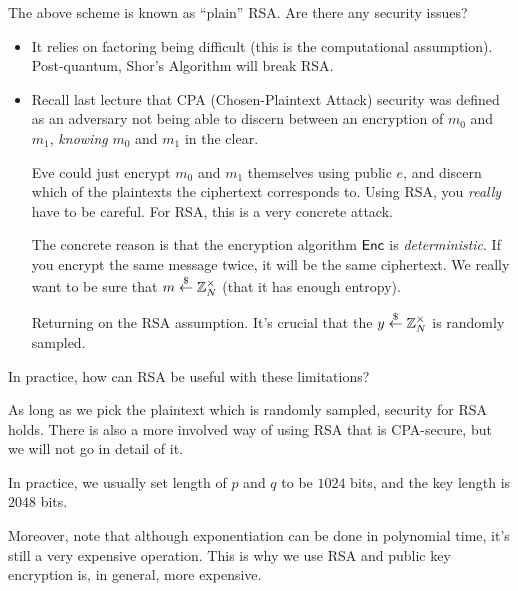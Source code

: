 \begin{ques*}
    The above scheme is known as ``plain'' RSA. Are there any security issues?
\end{ques*}
\begin{itemize}
    \item It relies on factoring being difficult (this is the computational assumption). Post-quantum, Shor's Algorithm will break RSA.
    \item Recall last lecture that CPA (Chosen-Plaintext Attack) security was defined as an adversary not being able to discern between an encryption of $m_0$ and $m_1$, \emph{knowing} $m_0$ and $m_1$ in the clear.

          Eve could just encrypt $m_0$ and $m_1$ themselves using public $e$, and discern which of the plaintexts the ciphertext corresponds to. Using RSA, you \emph{really} have to be careful. For RSA, this is a very concrete attack.

          The concrete reason is that the encryption algorithm $\operatorname{\mathsf{Enc}}$ is \emph{deterministic}. If you encrypt the same message twice, it will be the same ciphertext. We really want to be sure that $m\overset{\$}{\leftarrow} \mathbb Z_N^\times$ (that it has enough entropy).

          Returning on the RSA assumption. It's crucial that the $y\overset{\$}{\leftarrow} \mathbb Z_N^\times$ is randomly sampled.
\end{itemize}

\begin{ques*}
    In practice, how can RSA be useful with these limitations?
\end{ques*}

As long as we pick the plaintext which is randomly sampled, security for RSA holds. There is also a more involved way of using RSA that is CPA-secure, but we will not go in detail of it.

\begin{remark*}
    In practice, we usually set length of $p$ and $q$ to be $1024$ bits, and the key length is $2048$ bits.

    Moreover, note that although exponentiation can be done in polynomial time, it's still a very expensive operation. This is why we use RSA and public key encryption is, in general, more expensive.
\end{remark*}

